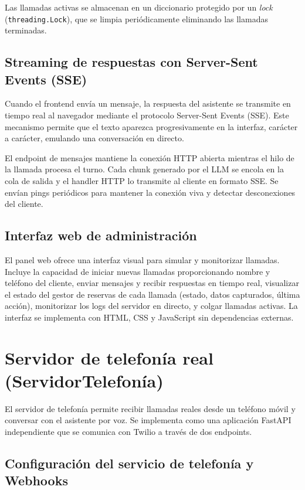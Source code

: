 Las llamadas activas se almacenan en un diccionario protegido por un \textit{lock} (\texttt{threading.Lock}), que se limpia periódicamente eliminando las llamadas terminadas.

\subsection{Streaming de respuestas con Server-Sent Events (SSE)}
\label{subsec:sse_streaming}

Cuando el frontend envía un mensaje, la respuesta del asistente se transmite en tiempo real al navegador mediante el protocolo Server-Sent Events (SSE). Este mecanismo permite que el texto aparezca progresivamente en la interfaz, carácter a carácter, emulando una conversación en directo.

El endpoint de mensajes mantiene la conexión HTTP abierta mientras el hilo de la llamada procesa el turno. Cada chunk generado por el LLM se encola en la cola de salida y el handler HTTP lo transmite al cliente en formato SSE. Se envían pings periódicos para mantener la conexión viva y detectar desconexiones del cliente.

\subsection{Interfaz web de administración}
\label{subsec:interfaz_web}

El panel web ofrece una interfaz visual para simular y monitorizar llamadas. Incluye la capacidad de iniciar nuevas llamadas proporcionando nombre y teléfono del cliente, enviar mensajes y recibir respuestas en tiempo real, visualizar el estado del gestor de reservas de cada llamada (estado, datos capturados, última acción), monitorizar los logs del servidor en directo, y colgar llamadas activas. La interfaz se implementa con HTML, CSS y JavaScript sin dependencias externas.

\section{Servidor de telefonía real (ServidorTelefonía)}
\label{sec:servidor_telefonia_impl}

El servidor de telefonía permite recibir llamadas reales desde un teléfono móvil y conversar con el asistente por voz. Se implementa como una aplicación FastAPI independiente que se comunica con Twilio a través de dos endpoints.

\subsection{Configuración del servicio de telefonía y Webhooks}
\label{sec:config_telefonia_webhooks}

